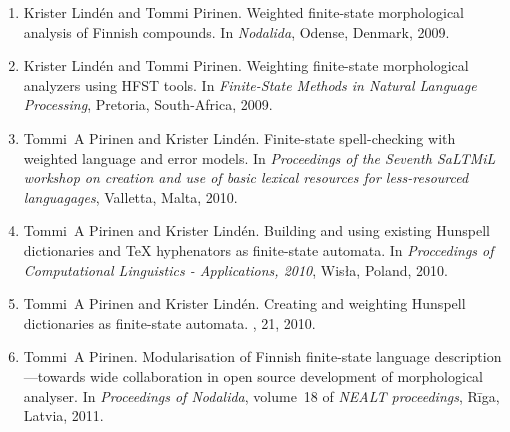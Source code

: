 \documentclass[officiallayout]{unihelcompling}
\begin{document}

\begin{enumerate}
    \item[\citetalias{pirinen2009weighted}]
        Krister Lindén and Tommi Pirinen.
        \newblock Weighted finite-state morphological analysis of Finnish 
        compounds.
        \newblock In \emph{Nodalida}, Odense, Denmark, 2009.
    \item[\citetalias{pirinen2009weighting}]
        Krister Lindén and Tommi Pirinen.
        \newblock Weighting finite-state morphological analyzers using HFST
        tools.
        \newblock In \emph{Finite-State Methods in Natural Language Processing},
        Pretoria, South-Africa, 2009.
    \item[\citetalias{pirinen2010finitestate}]
        Tommi~A Pirinen and Krister Lindén.
        \newblock Finite-state spell-checking with weighted language and error
        models.
        \newblock In {\em Proceedings of the Seventh SaLTMiL workshop on 
            creation and use of basic lexical resources for less-resourced 
        languagages}, Valletta, Malta, 2010.
    \item[\citetalias{pirinen2010building}]
        Tommi~A Pirinen and Krister Lindén.
        \newblock Building and using existing Hunspell dictionaries and {\TeX }
        hyphenators as finite-state automata.
        \newblock In {\em Proccedings of Computational Linguistics -
            Applications, 2010}, Wis{\l}a, Poland, 2010.
    \item[\citetalias{pirinen2010creating}]
        Tommi~A Pirinen and Krister Lindén.
        \newblock Creating and weighting Hunspell dictionaries as finite-state
        automata.
        , 21, 2010.
    \item[\citetalias{pirinen2011modularisation}]
        Tommi~A Pirinen.
        \newblock Modularisation of Finnish finite-state language 
        description—towards wide collaboration in open source development of
        morphological analyser.
        \newblock In {\em Proceedings of Nodalida}, volume~18 of {\em NEALT
        proceedings}, Rīga, Latvia, 2011.

\end{enumerate}
\end{document}
